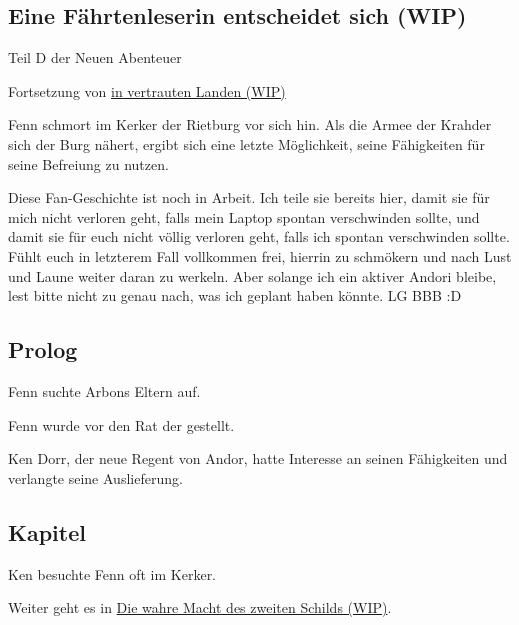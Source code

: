\begin{chapterbox}
    \chapter{Eine Fährtenleserin entscheidet sich (WIP)}
    \label{wip-eine-faehrtenleserin-entscheidet-sich}
    
    \begin{center}
        Teil D der Neuen Abenteuer\sidenotemark

        Fortsetzung von \hyperref[wip-in-vertrauten-landen]{in vertrauten Landen (WIP)}
    \end{center}

    Fenn schmort im Kerker der Rietburg vor sich hin. Als die Armee der Krahder sich der Burg nähert, ergibt sich eine letzte Möglichkeit, seine Fähigkeiten für seine Befreiung zu nutzen.
\end{chapterbox}





Diese Fan-Geschichte ist noch in Arbeit. Ich teile sie bereits hier, damit sie für mich nicht verloren geht, falls mein Laptop spontan verschwinden sollte, und damit sie für euch nicht völlig verloren geht, falls ich spontan verschwinden sollte. Fühlt euch in letzterem Fall vollkommen frei, hierrin zu schmökern und nach Lust und Laune weiter daran zu werkeln. Aber solange ich ein aktiver Andori bleibe, lest bitte nicht zu genau nach, was ich geplant haben könnte. LG BBB :D



\newpage
\section{Prolog}

Fenn suchte Arbons Eltern auf.

Fenn wurde vor den Rat der  gestellt.

Ken Dorr, der neue Regent von Andor, hatte Interesse an seinen Fähigkeiten und verlangte seine Auslieferung.




\newpage
\section{Kapitel}

Ken besuchte Fenn oft im Kerker.






\begin{commentbox}
    Weiter geht es in \hyperref[wip-die-wahre-macht-des-zweiten-schilds]{Die wahre Macht des zweiten Schilds (WIP)}.
\end{commentbox}